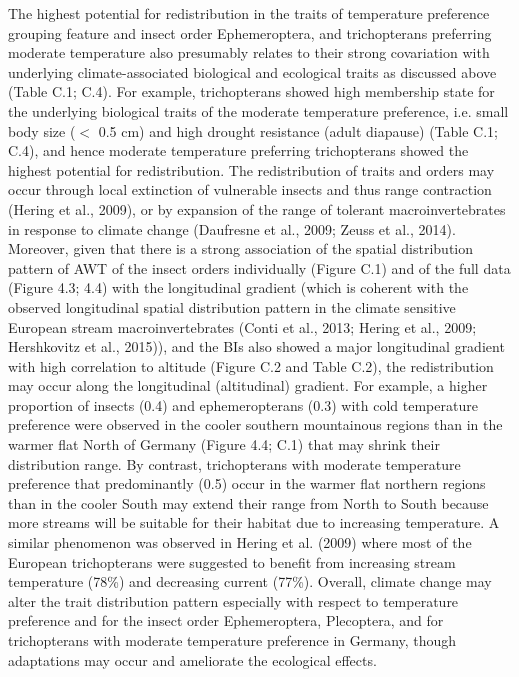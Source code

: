 The highest potential for redistribution in the traits of temperature preference grouping feature and insect order Ephemeroptera, and trichopterans preferring moderate temperature also presumably relates to their strong covariation with underlying climate-associated biological and ecological traits as discussed above (Table C.1; C.4). For example, trichopterans showed high membership state for the underlying biological traits of the moderate temperature preference, i.e. small body size ($<$ 0.5 cm) and high drought resistance (adult diapause) (Table C.1; C.4), and hence moderate temperature preferring trichopterans showed the highest potential for redistribution. The redistribution of traits and orders may occur through local extinction of vulnerable insects and thus range contraction (Hering et al., 2009), or by expansion of the range of tolerant macroinvertebrates in response to climate change (Daufresne et al., 2009; Zeuss et al., 2014). Moreover, given that there is a strong association of the spatial distribution pattern of AWT of the insect orders individually (Figure C.1) and of the full data (Figure 4.3; 4.4) with the longitudinal gradient (which is coherent with the observed longitudinal spatial distribution pattern in the climate sensitive European stream macroinvertebrates (Conti et al., 2013; Hering et al., 2009; Hershkovitz et al., 2015)), and the BIs also showed a major longitudinal gradient with high correlation to altitude (Figure C.2 and Table C.2), the redistribution may occur along the longitudinal (altitudinal) gradient. For example, a higher proportion of insects (0.4) and ephemeropterans (0.3) with cold temperature preference were observed in the cooler southern mountainous regions than in the warmer flat North of Germany (Figure 4.4; C.1) that may shrink their distribution range. By contrast, trichopterans with moderate temperature preference that predominantly (0.5) occur in the warmer flat northern regions than in the cooler South may extend their range from North to South because more streams will be suitable for their habitat due to increasing temperature. A similar phenomenon was observed in Hering et al. (2009) where most of the European trichopterans were suggested to benefit from increasing stream temperature (78\%) and decreasing current (77\%). Overall, climate change may alter the trait distribution pattern especially with respect to temperature preference and for the insect order Ephemeroptera, Plecoptera, and for trichopterans with moderate temperature preference in Germany, though adaptations may occur and ameliorate the ecological effects.

